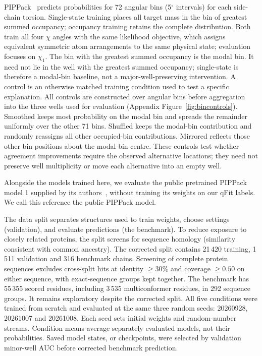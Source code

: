 \documentclass[10pt,twocolumn,a4paper]{article}
\begin{document}
PIPPack~\citep{randolph2024pippack} predicts probabilities for 72 angular bins (5$^\circ$ intervals) for each side-chain torsion. Single-state training places all target mass in the bin of greatest summed occupancy; occupancy training retains the complete distribution. Both train all four $\chi$ angles with the same likelihood objective, which assigns equivalent symmetric atom arrangements to the same physical state; evaluation focuses on $\chi_1$. The bin with the greatest summed occupancy is the modal bin. It need not lie in the well with the greatest summed occupancy; single-state is therefore a modal-bin baseline, not a major-well-preserving intervention. A control is an otherwise matched training condition used to test a specific explanation. All controls are constructed over angular bins before aggregation into the three wells used for evaluation (Appendix Figure~\ref{fig:bincontrols}). Smoothed keeps most probability on the modal bin and spreads the remainder uniformly over the other 71 bins. Shuffled keeps the modal-bin contribution and randomly reassigns all other occupied-bin contributions. Mirrored reflects those other bin positions about the modal-bin centre. These controls test whether agreement improvements require the observed alternative locations; they need not preserve well multiplicity or move each alternative into an empty well.

Alongside the models trained here, we evaluate the public pretrained PIPPack model 1 supplied by its authors~\citep{randolph2024pippack}, without training its weights on our qFit labels. We call this reference the public PIPPack model.

The data split separates structures used to train weights, choose settings (validation), and evaluate predictions (the benchmark). To reduce exposure to closely related proteins, the split screens for sequence homology (similarity consistent with common ancestry). The corrected split contains 21\,420 training, 1\,511 validation and 316 benchmark chains. Screening of complete protein sequences excludes cross-split hits at identity $\geq30\%$ and coverage $\geq0.50$ on either sequence, with exact-sequence groups kept together. The benchmark has 55\,355 scored residues, including 3\,535 multiconformer residues, in 292 sequence groups. It remains exploratory despite the corrected split. All five conditions were trained from scratch and evaluated at the same three random seeds: 20260928, 20261007 and 20261008. Each seed sets initial weights and random-number streams. Condition means average separately evaluated models, not their probabilities. Saved model states, or checkpoints, were selected by validation minor-well AUC before corrected benchmark prediction.
\end{document}
